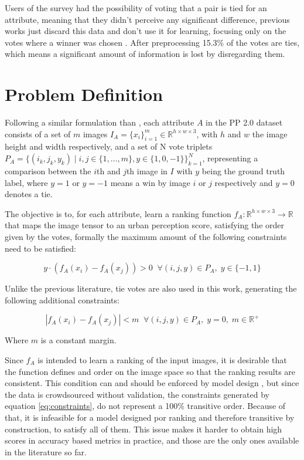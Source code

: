 Users of the survey had the possibility of voting that a pair is tied for an attribute,
meaning that they didn't perceive any significant difference, previous works just
discard this data and don't use it for learning, focusing only on the votes where a winner was
chosen \cite{hidalgo_placepulse,zhang_measuring,tamara_judgments}. After preprocessing 15.3\% of the
votes are ties, which means a significant amount of information is lost by disregarding them.


\section{Problem Definition}

Following a similar formulation than , each attribute $A$ in the PP 2.0 dataset consists of a set
of $m$ images $I_A = \{x_i\}_{i=1}^m \in \mathbb{R}^{h \times w \times 3}$, with $h$ and $w$
the image height and width respectively, and a set of N vote triplets
$P_A=\{(i_k, j_k, y_k) \;|\; i,j \in \{1, \ldots, m \} , y \in \{1,0,-1\}\}_{k=1}^N$, representing a comparison
between the $i$th and $j$th image in $I$ with $y$ being the ground truth label, where $y=1$ or $y=-1$ means a win by image
$i$ or $j$ respectively and  $y=0$ denotes a tie.

The objective is to, for each attribute, learn a ranking function $f_A : \mathbb{R}^{h \times w \times 3} \rightarrow \mathbb{R}$
that maps the image tensor to an urban perception score, satisfying the order given by the votes, formally the
maximum amount of the following constraints need to be satisfied:

\begin{equation}
y \cdot (f_A(x_i) - f_A(x_j)) > 0 \;\; \forall (i,j,y) \in P_A, \; y \in \{-1,1\}
\label{eq:constraints}
\end{equation}

Unlike the previous literature, tie votes are also used in this work, generating the following additional constraints:

\begin{equation}
	|f_A(x_i) - f_A(x_j)| < m \;\; \forall (i,j,y) \in P_A, \; y = 0, \; m \in \mathbb{R}^+
	\label{eq:constraints_ties}
\end{equation}

Where $m$ is a constant margin.

Since $f_A$ is intended to learn a ranking of the input images, it is desirable that the function defines and order
on the image space so that the ranking results are consistent. This condition can and should be enforced by
model design \cite{koppel_pairwise}, but since the data is crowdsourced without
validation, the constraints generated by equation \ref{eq:constraints}, do not represent a  100\% transitive order.
Because of that, it is infeasible for a model designed por ranking and therefore
transitive by construction, to satisfy all of them.
This issue makes it harder to obtain high scores in accuracy based metrics in practice, and
those are the only ones available in the literature so far.
